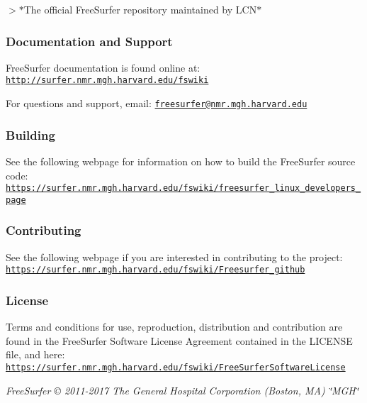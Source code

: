 $>$$\ast$\+The official Free\+Surfer repository maintained by L\+C\+N$\ast$

\subsubsection*{Documentation and Support}

Free\+Surfer documentation is found online at\+: \href{http://surfer.nmr.mgh.harvard.edu/fswiki}{\tt http\+://surfer.\+nmr.\+mgh.\+harvard.\+edu/fswiki}

For questions and support, email\+: \href{mailto:freesurfer@nmr.mgh.harvard.edu}{\tt freesurfer@nmr.\+mgh.\+harvard.\+edu}

\subsubsection*{Building}

See the following webpage for information on how to build the Free\+Surfer source code\+: \href{https://surfer.nmr.mgh.harvard.edu/fswiki/freesurfer_linux_developers_page}{\tt https\+://surfer.\+nmr.\+mgh.\+harvard.\+edu/fswiki/freesurfer\+\_\+linux\+\_\+developers\+\_\+page}

\subsubsection*{Contributing}

See the following webpage if you are interested in contributing to the project\+: \href{https://surfer.nmr.mgh.harvard.edu/fswiki/Freesurfer_github}{\tt https\+://surfer.\+nmr.\+mgh.\+harvard.\+edu/fswiki/\+Freesurfer\+\_\+github}

\subsubsection*{License}

Terms and conditions for use, reproduction, distribution and contribution are found in the Free\+Surfer Software License Agreement contained in the L\+I\+C\+E\+N\+SE file, and here\+: \href{https://surfer.nmr.mgh.harvard.edu/fswiki/FreeSurferSoftwareLicense}{\tt https\+://surfer.\+nmr.\+mgh.\+harvard.\+edu/fswiki/\+Free\+Surfer\+Software\+License}

{\itshape Free\+Surfer © 2011-\/2017 The General Hospital Corporation (Boston, MA) \char`\"{}\+M\+G\+H\char`\"{}} 